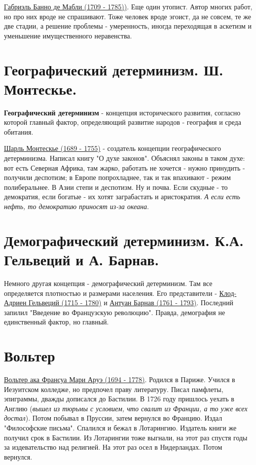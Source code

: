 \underline{Габриэль Банно де Мабли (1709 - 1785))}. Еще один утопист. Автор многих работ, но про них вроде не спрашивают. Тоже человек вроде эгоист, да не совсем, те же две стадии, а решение проблемы - умеренность, иногда переходящая в аскетизм и уменьшение имущественного неравенства.

\section{Географический детерминизм. Ш. Монтескье.}
\textbf{Географический детерминизм} - концепция исторического развития, согласно которой главный фактор, определяющий развитие народов - география и среда обитания.

\underline{Шарль Монтескье (1689 - 1755)} - создатель концепции географического детерминизма. Написал книгу "О духе законов". Объяснял законы в таком духе: вот есть Северная Африка, там жарко, работать не хочется - нужно принудить - получили деспотизм; в Европе попрохладнее, так и так впахивают - режим полиберальнее. В Азии степи и деспотизм. Ну и почва. Если скудные - то демократия, если богатые - их хотят заграбастать и аристократия. \textit{А если есть нефть, то демократию приносят из-за океана}.  

\section{Демографический детерминизм.  К.А. Гельвеций и А. Барнав.}
Немного другая концепция - демографический детерминизм.  Там все определяется плотностью и размерами населения. Его представители - \underline{Клод-Адриен Гельвеций (1715 - 1780)} и \underline{Антуан Барнав (1761 - 1793)}. Последний запилил "Введение во Французскую революцию". Правда, демография не единственный фактор, но главный.

\section{Вольтер}
\underline{Вольтер ака Франсуа Мари Аруэ (1694 - 1778)}. Родился в Париже. Учился в Иезуитском колледже, но предпочел праву литературу. Писал памфлеты, эпиграммы, дважды дописался до Бастилии. В 1726 году пришлось уехать в Англию (\textit{вышел из тюрьмы с условием, что свалит из Франции, а то уже всех достал}). Потом побывал в Пруссии, затем вернулся во Францию. Издал "Философские письма". Спалился и бежал в Лотарингию. Издатель книги же получил срок в Бастилии. Из Лотарингии тоже выгнали, на этот раз спустя годы за издевательство над религией. На этот раз осел в Нидерландах. Потом вернулся.

